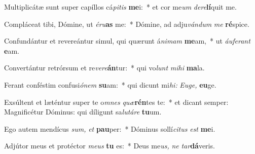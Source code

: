 \item Multiplicátæ sunt super capíllos cá\hspace*{0.02em}\textit{pitis} \textbf{me}i:~* et cor me\tinyhspace\textit{um} \textit{dere}\textbf{lí}quit me.
\item Compláceat tibi, Dómine, ut \textit{éru}\textbf{as} me:~* Dómine, ad adju\textit{vándum} \textit{me} \textbf{ré}spice.
\item Confundántur et revereántur simul, qui quærunt á\textit{nimam} \textbf{me}am,~* ut \textit{áuferant} \textbf{e}am.
\item Convertántur retrórsum et re\textit{vere}\textbf{án}tur:~* qui vo\textit{lunt} \textit{mihi} \textbf{ma}la.
\item Ferant conféstim confusi\tinyhspace\textit{ónem} \textbf{su}am:~* qui dicunt mi\textit{hi:} \textit{Euge,} \textbf{eu}ge.
\item Exsúltent et læténtur super te o\textit{mnes} \textit{quæ}\textbf{rén}tes te:~* et dicant semper: Magnificétur Dóminus: qui díligunt sa\tinyhspace\textit{lutáre} \textbf{tu}um.
\item Ego autem mendícus \textit{sum,} \textit{et} \textbf{pau}per:~* Dóminus sollí\tinyhspace\textit{citus} \textit{est} \textbf{me}i.
\item Adjútor meus et protéctor \textit{meus} \textbf{tu} es:~* Deus me\tinyhspace\textit{us,} \textit{ne} \textit{tar}\textbf{dá}veris.

